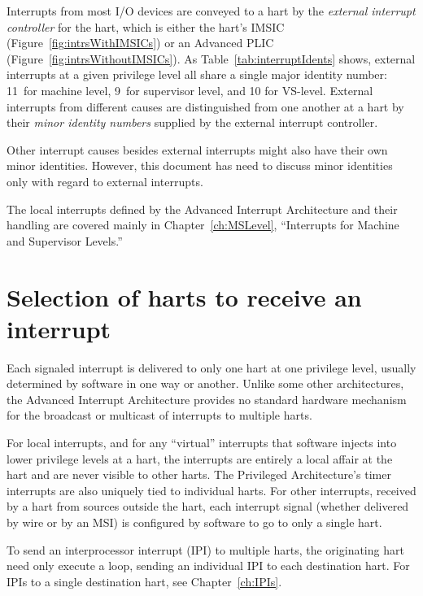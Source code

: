Interrupts from most I/O devices are conveyed to a hart by the
\emph{external interrupt controller} for the hart, which is either the
hart's IMSIC (Figure~\ref{fig:intrsWithIMSICs}) or an Advanced PLIC
(Figure~\ref{fig:intrsWithoutIMSICs}).
As Table~\ref{tab:interruptIdents} shows, external interrupts
at a given privilege level all share a single major identity
number:  11~for machine level, 9~for supervisor level, and 10 for
\mbox{VS-level}.
External interrupts from different causes are distinguished from one
another at a hart by their \emph{minor identity numbers} supplied by
the external interrupt controller.

Other interrupt causes besides external interrupts might also have
their own minor identities.
However, this document has need to discuss minor identities only with
regard to external interrupts.

The local interrupts defined by the Advanced Interrupt Architecture
and their handling are covered mainly in Chapter~\ref{ch:MSLevel},
``Interrupts for Machine and Supervisor Levels.''

\section{Selection of harts to receive an interrupt}

Each signaled interrupt is delivered to only one hart at one privilege
level, usually determined by software in one way or another.
Unlike some other architectures, the {\RISCV} Advanced Interrupt
Architecture provides no standard hardware mechanism for the broadcast
or multicast of interrupts to multiple harts.

For local interrupts, and for any ``virtual'' interrupts that software
injects into lower privilege levels at a hart, the interrupts are
entirely a local affair at the hart and are never visible to other
harts.
The {\RISCV} Privileged Architecture's timer interrupts are also
uniquely tied to individual harts.
For other interrupts, received by a hart from sources outside the
hart, each interrupt signal (whether delivered by wire or by an MSI) is
configured by software to go to only a single hart.

To send an interprocessor interrupt (IPI) to multiple harts, the
originating hart need only execute a loop, sending an individual IPI to
each destination hart.
For IPIs to a single destination hart, see Chapter~\ref{ch:IPIs}.

